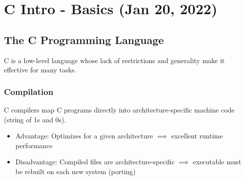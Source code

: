 \chapter{C Intro - Basics (Jan 20, 2022)}

\section{The C Programming Language}
C is a low-level language whose lack of restrictions and generality make it effective for many tasks.

\subsection{Compilation}
C compilers map C programs directly into architecture-specific machine code (string of 1s and 0s).

\begin{itemize}
    \item Advantage: Optimizes for a given architecture \(\implies\) excellent runtime performance
    \item Disadvantage: Compiled files are architecture-specific \(\implies\) executable must be rebuilt on each new system (porting)
\end{itemize}


